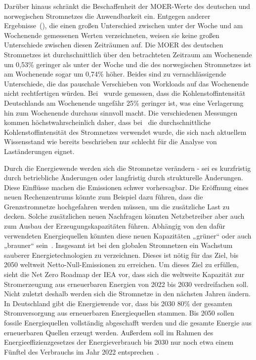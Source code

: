 Darüber hinaus schränkt die Beschaffenheit der \ac{MOER}-Werte des deutschen und norwegischen Stromnetzes die Anwendbarkeit ein.
Entgegen anderer Ergebnisse~(\cite{Wiesner.2021}), die einen großen Unterschied zwischen unter der Woche und am Wochenende gemessenen Werten verzeichneten, weisen sie keine großen Unterschiede zwischen diesen Zeiträumen auf.
Die \ac{MOER} des deutschen Stromnetzes ist durchschnittlich über den betrachteten Zeitraum am Wochenende um 0,53\% geringer als unter der Woche und die des norwegischen Stromnetzes ist am Wochenende sogar um 0,74\% höher.
Beides sind zu vernachlässigende Unterschiede, die das pauschale Verschieben von Workloads auf das Wochenende nicht rechtfertigen würden.
Bei~\cite{Wiesner.2021} wurde gemessen, dass die Kohlenstoffintensität Deutschlands am Wochenende ungefähr 25\% geringer ist, was eine Verlagerung hin zum Wochenende durchaus sinnvoll macht.
Die verschiedenen Messungen kommen höchstwahrscheinlich daher, dass bei~\cite{Wiesner.2021} die durchschnittliche Kohlenstoffintensität des Stromnetzes verwendet wurde, die sich nach aktuellem Wissensstand wie bereits beschrieben nur schlecht für die Analyse von Laständerungen eignet.

Durch die Energiewende werden sich die Stromnetze verändern - sei es kurzfristig durch betriebliche Änderungen oder langfristig durch strukturelle Änderungen.
Diese Einflüsse machen die Emissionen schwer vorhersagbar.
Die Eröffnung eines neuen Rechenzentrums könnte zum Beispiel dazu führen, dass die Grenzstromnetze hochgefahren werden müssen, um die zusätzliche Last zu decken.
Solche zusätzlichen neuen Nachfragen könnten Netzbetreiber aber auch zum Ausbau der Erzeugungskapazitäten führen.
Abhängig von den dafür verwendeten Energiequellen könnten diese neuen Kapazitäten „grüner“ oder auch „brauner“ sein~\cite{WattTime.2022}.
Insgesamt ist bei den globalen Stromnetzen ein Wachstum sauberer Energietechnologien zu verzeichnen.
Dieses ist nötig für das Ziel, bis 2050 weltweit Netto-Null-Emissionen zu erreichen.
Um dieses Ziel zu erfüllen, sieht die Net Zero Roadmap der IEA vor, dass sich die weltweite Kapazität zur Stromerzeugung aus erneuerbaren Energien von 2022 bis 2030 verdreifachen soll.
Nicht zuletzt deshalb werden sich die Stromnetze in den nächsten Jahren ändern.
In Deutschland gibt die Energiewende vor, dass bis 2030 80\% der gesamten Stromversorgung aus erneuerbaren Energiequellen stammen.
Bis 2050 sollen fossile Energiequellen vollständig abgeschafft werden und die gesamte Energie aus erneuerbaren Quellen erzeugt werden.
Außerdem soll im Rahmen des Energieeffizienzgesetzes der Energieverbrauch bis 2030 nur noch etwa einem Fünftel des Verbrauchs im Jahr 2022 entsprechen~\cite{InternationalEnergyAgengy.2023}.

